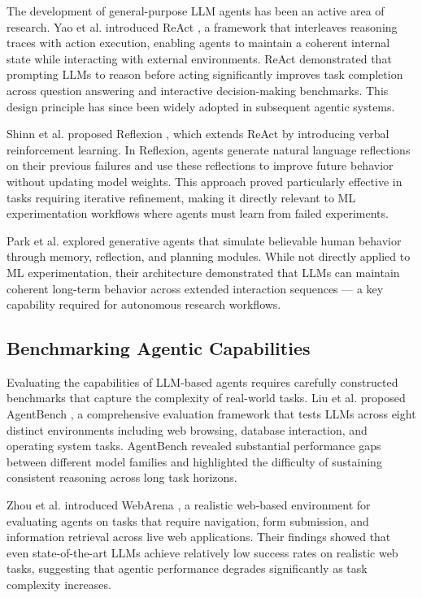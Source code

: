 \documentclass[conference]{IEEEtran}
\begin{document}
The development of general-purpose LLM agents has been an active area of
research. Yao et al. introduced ReAct \cite{yao2023react}, a framework that
interleaves reasoning traces with action execution, enabling agents to maintain
a coherent internal state while interacting with external environments. ReAct
demonstrated that prompting LLMs to reason before acting significantly improves
task completion across question answering and interactive decision-making
benchmarks. This design principle has since been widely adopted in subsequent
agentic systems.

Shinn et al. proposed Reflexion \cite{shinn2023reflexion}, which extends ReAct
by introducing verbal reinforcement learning. In Reflexion, agents generate
natural language reflections on their previous failures and use these reflections
to improve future behavior without updating model weights. This approach proved
particularly effective in tasks requiring iterative refinement, making it
directly relevant to ML experimentation workflows where agents must learn from
failed experiments.

Park et al. explored generative agents \cite{park2023generative} that simulate
believable human behavior through memory, reflection, and planning modules.
While not directly applied to ML experimentation, their architecture demonstrated
that LLMs can maintain coherent long-term behavior across extended interaction
sequences --- a key capability required for autonomous research workflows.

\subsection{Benchmarking Agentic Capabilities}

Evaluating the capabilities of LLM-based agents requires carefully constructed
benchmarks that capture the complexity of real-world tasks. Liu et al. proposed
AgentBench \cite{liu2024agentbench}, a comprehensive evaluation framework that
tests LLMs across eight distinct environments including web browsing, database
interaction, and operating system tasks. AgentBench revealed substantial
performance gaps between different model families and highlighted the difficulty
of sustaining consistent reasoning across long task horizons.

Zhou et al. introduced WebArena \cite{zhou2023webarena}, a realistic web-based
environment for evaluating agents on tasks that require navigation, form
submission, and information retrieval across live web applications. Their
findings showed that even state-of-the-art LLMs achieve relatively low success
rates on realistic web tasks, suggesting that agentic performance degrades
significantly as task complexity increases.
\end{document}
